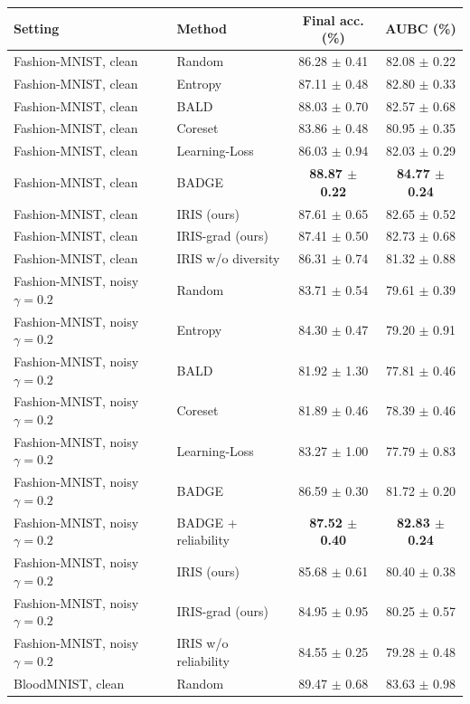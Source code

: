 \begin{tabular}{llcc}
\toprule
Setting & Method & Final acc. (\%) & AUBC (\%) \\
\midrule
Fashion-MNIST, clean & Random & 86.28 $\pm$ 0.41 & 82.08 $\pm$ 0.22 \\
Fashion-MNIST, clean & Entropy & 87.11 $\pm$ 0.48 & 82.80 $\pm$ 0.33 \\
Fashion-MNIST, clean & BALD & 88.03 $\pm$ 0.70 & 82.57 $\pm$ 0.68 \\
Fashion-MNIST, clean & Coreset & 83.86 $\pm$ 0.48 & 80.95 $\pm$ 0.35 \\
Fashion-MNIST, clean & Learning-Loss & 86.03 $\pm$ 0.94 & 82.03 $\pm$ 0.29 \\
Fashion-MNIST, clean & BADGE & \textbf{88.87 $\pm$ 0.22} & \textbf{84.77 $\pm$ 0.24} \\
Fashion-MNIST, clean & IRIS (ours) & 87.61 $\pm$ 0.65 & 82.65 $\pm$ 0.52 \\
Fashion-MNIST, clean & IRIS-grad (ours) & 87.41 $\pm$ 0.50 & 82.73 $\pm$ 0.68 \\
Fashion-MNIST, clean & IRIS w/o  diversity & 86.31 $\pm$ 0.74 & 81.32 $\pm$ 0.88 \\
\midrule
Fashion-MNIST, noisy $\gamma{=}0.2$ & Random & 83.71 $\pm$ 0.54 & 79.61 $\pm$ 0.39 \\
Fashion-MNIST, noisy $\gamma{=}0.2$ & Entropy & 84.30 $\pm$ 0.47 & 79.20 $\pm$ 0.91 \\
Fashion-MNIST, noisy $\gamma{=}0.2$ & BALD & 81.92 $\pm$ 1.30 & 77.81 $\pm$ 0.46 \\
Fashion-MNIST, noisy $\gamma{=}0.2$ & Coreset & 81.89 $\pm$ 0.46 & 78.39 $\pm$ 0.46 \\
Fashion-MNIST, noisy $\gamma{=}0.2$ & Learning-Loss & 83.27 $\pm$ 1.00 & 77.79 $\pm$ 0.83 \\
Fashion-MNIST, noisy $\gamma{=}0.2$ & BADGE & 86.59 $\pm$ 0.30 & 81.72 $\pm$ 0.20 \\
Fashion-MNIST, noisy $\gamma{=}0.2$ & BADGE + reliability & \textbf{87.52 $\pm$ 0.40} & \textbf{82.83 $\pm$ 0.24} \\
Fashion-MNIST, noisy $\gamma{=}0.2$ & IRIS (ours) & 85.68 $\pm$ 0.61 & 80.40 $\pm$ 0.38 \\
Fashion-MNIST, noisy $\gamma{=}0.2$ & IRIS-grad (ours) & 84.95 $\pm$ 0.95 & 80.25 $\pm$ 0.57 \\
Fashion-MNIST, noisy $\gamma{=}0.2$ & IRIS w/o  reliability & 84.55 $\pm$ 0.25 & 79.28 $\pm$ 0.48 \\
\midrule
BloodMNIST, clean & Random & 89.47 $\pm$ 0.68 & 83.63 $\pm$ 0.98 \\

\end{tabular}
